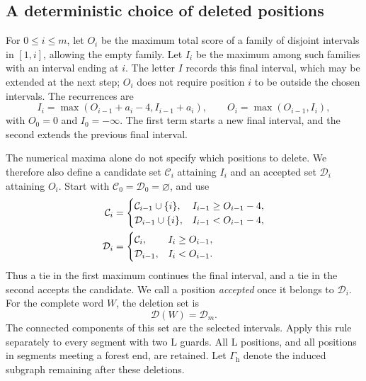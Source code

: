 \documentclass[11pt,a4paper]{article}
\theoremstyle{definition}
\theoremstyle{remark}
\newcommand{\LL}{\mathrm L}
\newcommand{\Gh}{\Gamma_{\mathrm h}}
\begin{document}
\subsection{A deterministic choice of deleted positions}\label{sec:deletion-rule}
For $0\le i\le m$, let $O_i$ be the maximum total score of a family of disjoint intervals in $[1,i]$, allowing the empty family. Let $I_i$ be the maximum among such families with an interval ending at $i$. The letter $I$ records this final interval, which may be extended at the next step; $O_i$ does not require position $i$ to be outside the chosen intervals. The recurrences are
\begin{equation}\label{eq:schedule}
I_i=\max(O_{i-1}+a_i-4,I_{i-1}+a_i),\qquad
O_i=\max(O_{i-1},I_i),
\end{equation}
with $O_0=0$ and $I_0=-\infty$. The first term starts a new final interval, and the second extends the previous final interval.

The numerical maxima alone do not specify which positions to delete. We therefore also define a candidate set $\mathcal C_i$ attaining $I_i$ and an accepted set $\mathcal D_i$ attaining $O_i$. Start with $\mathcal C_0=\mathcal D_0=\varnothing$, and use
\begin{align}\label{eq:selected-sets}
\mathcal C_i&=
\begin{cases}
\mathcal C_{i-1}\cup\{i\},&I_{i-1}\ge O_{i-1}-4,\\
\mathcal D_{i-1}\cup\{i\},&I_{i-1}<O_{i-1}-4,
\end{cases}\notag\\
\mathcal D_i&=
\begin{cases}
\mathcal C_i,&I_i\ge O_{i-1},\\
\mathcal D_{i-1},&I_i<O_{i-1}.
\end{cases}
\end{align}
Thus a tie in the first maximum continues the final interval, and a tie in the second accepts the candidate. We call a position \emph{accepted} once it belongs to $\mathcal D_i$. For the complete word $W$, the deletion set is
\[
\mathcal D(W)=\mathcal D_m.
\]
The connected components of this set are the selected intervals. Apply this rule separately to every segment with two $\LL$ guards. All $\LL$ positions, and all positions in segments meeting a forest end, are retained. Let $\Gh$ denote the induced subgraph remaining after these deletions.
\end{document}
